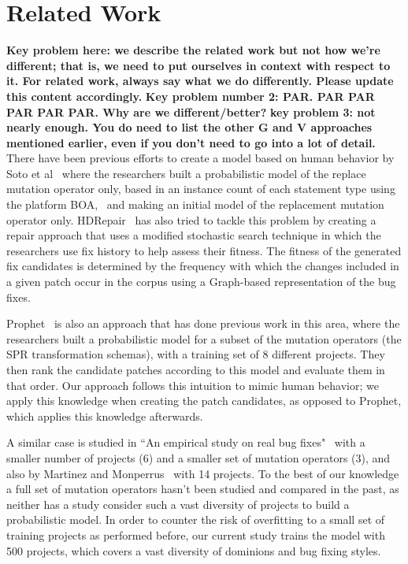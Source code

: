 \documentclass[conference]{IEEEtran}
\newcommand{\todo}[1]
  {{\scriptsize \textbf{\color{red} {#1}}}}
\begin{document}
\section{Related Work} \label{relatedWork}

\todo{Key problem here: we describe the related work but not how we're
  different; that is, we need to put ourselves in context with respect to it.
  For related work, always say what we do differently.  Please update this
  content accordingly.}
\todo{Key problem number 2: PAR.  PAR PAR PAR PAR PAR.  Why are we different/better?}
\todo{key problem 3: not nearly enough.  You do need to list the other G and V approaches mentioned earlier, even if 
you don't need to go into a lot of detail.}
There have been previous efforts to create a model based on human behavior by Soto et al~\cite{Soto15} 
where the researchers built a probabilistic model of the replace mutation 
operator only, based in 
an instance count of each statement type using the platform 
BOA,~\cite{dyer2013} and making an initial model of the replacement mutation 
operator only. HDRepair~\cite{xuan16} has also tried to tackle this problem by 
creating a repair approach that uses a modified stochastic search
technique in which the researchers use fix history
to help assess their fitness. The fitness of the generated
fix candidates is determined by the frequency with which the changes included in a given patch occur in the corpus using a Graph-based representation of the bug fixes.

Prophet~\cite{long15Proph} is also an approach that has done previous work in this 
area, where the researchers built a 
probabilistic model for a subset of the mutation operators (the SPR transformation schemas), with a training set 
of 8 different projects. They then rank the candidate patches according to this model and evaluate them in that order. Our approach follows this intuition to mimic human behavior; we apply this knowledge when creating the patch candidates, as opposed to Prophet, which applies this knowledge afterwards. 

A similar case is studied in ``An empirical study on 
real bug fixes"~\cite{zhong15} with a smaller number of projects (6) and a 
smaller set of 
mutation operators (3), and also by Martinez and Monperrus~\cite{martinez15} with 14 
projects. To the best of our knowledge a full set of mutation 
operators hasn't been studied and compared in the past, as neither has a study 
consider such a vast diversity of projects to build a probabilistic model. In 
order to counter the 
risk of overfitting to a small set of training projects as performed before, our 
current study trains the model with 500 projects, which covers a vast diversity 
of dominions and bug fixing styles.
\end{document}
